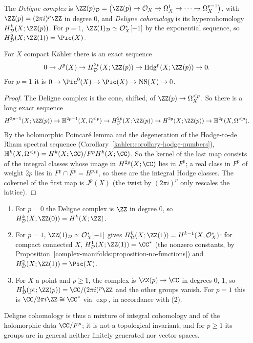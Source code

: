\begin{definition}\label{vhs:definition-deligne-complex}
The \emph{Deligne complex} is $\ZZ(p)_{\mathcal{D}} = \big(\ZZ(p) \to \mathcal{O}_X \to \Omega^1_X \to \cdots \to \Omega^{p-1}_X\big)$, with $\ZZ(p) = (2\pi i)^p\ZZ$ in degree $0$, and \emph{Deligne cohomology}
is its hypercohomology $H^k_{\mathcal{D}}(X; \ZZ(p))$. For $p = 1$, $\ZZ(1)_{\mathcal{D}} \simeq \mathcal{O}_X^*[-1]$ by the exponential sequence, so $H^2_{\mathcal{D}}(X; \ZZ(1)) = \Pic(X)$.
\end{definition}

\begin{proposition}\label{vhs:proposition-deligne-sequence}
For $X$ compact K\"ahler there is an exact sequence
\[
0 \to J^p(X) \to H^{2p}_{\mathcal{D}}(X; \ZZ(p)) \to \mathrm{Hdg}^p(X; \ZZ(p)) \to 0 .
\]
For $p = 1$ it is $0 \to \Pic^0(X) \to \Pic(X) \to \mathrm{NS}(X) \to 0$.
\end{proposition}

\begin{proof}
The Deligne complex is the cone, shifted, of $\ZZ(p) \to \Omega^{<p}_X$. So there is a long exact sequence
\[
H^{2p-1}(X; \ZZ(p)) \to \mathbb{H}^{2p-1}(X, \Omega^{<p}) \to H^{2p}_{\mathcal{D}}(X; \ZZ(p)) \to H^{2p}(X; \ZZ(p)) \to \mathbb{H}^{2p}(X, \Omega^{<p}) .
\]
By the holomorphic Poincar\'e lemma and the degeneration of the Hodge-to-de Rham spectral sequence (Corollary~\ref{kahler:corollary-hodge-numbers}),
$\mathbb{H}^k(X, \Omega^{<p}) = H^k(X; \CC)/F^pH^k(X; \CC)$. So the kernel of the last map consists of the integral classes whose image in $H^{2p}(X; \CC)$ lies in $F^p$; a real class in $F^p$ of
weight $2p$ lies in $F^p \cap \overline{F^p} = H^{p,p}$, so these are the integral Hodge classes. The cokernel of the first map is $J^p(X)$ (the twist by $(2\pi i)^p$ only rescales the lattice).
\end{proof}

\begin{example}\label{vhs:example-deligne-low-degree}
\begin{enumerate}
\item For $p = 0$ the Deligne complex is $\ZZ$ in degree $0$, so $H^k_{\mathcal{D}}(X; \ZZ(0)) = H^k(X; \ZZ)$.
\item For $p = 1$, $\ZZ(1)_{\mathcal{D}} \simeq \mathcal{O}_X^*[-1]$ gives $H^k_{\mathcal{D}}(X; \ZZ(1)) = H^{k-1}(X, \mathcal{O}_X^*)$: for compact connected $X$, $H^1_{\mathcal{D}}(X; \ZZ(1)) = \CC^*$ (the
nonzero constants, by Proposition~\ref{complex-manifolds:proposition-no-functions}) and $H^2_{\mathcal{D}}(X; \ZZ(1)) = \Pic(X)$.
\item For $X$ a point and $p \geq 1$, the complex is $\ZZ(p) \to \CC$ in degrees $0$, $1$, so $H^1_{\mathcal{D}}(\mathrm{pt}; \ZZ(p)) = \CC/(2\pi i)^p\ZZ$ and the other groups vanish. For $p = 1$ this is
$\CC/2\pi i\ZZ \cong \CC^*$ via $\exp$, in accordance with (2).
\end{enumerate}
Deligne cohomology is thus a mixture of integral cohomology and of the holomorphic data $\CC/F^p$; it is not a topological invariant, and for $p \geq 1$ its groups are in general neither finitely generated nor
vector spaces.
\end{example}

